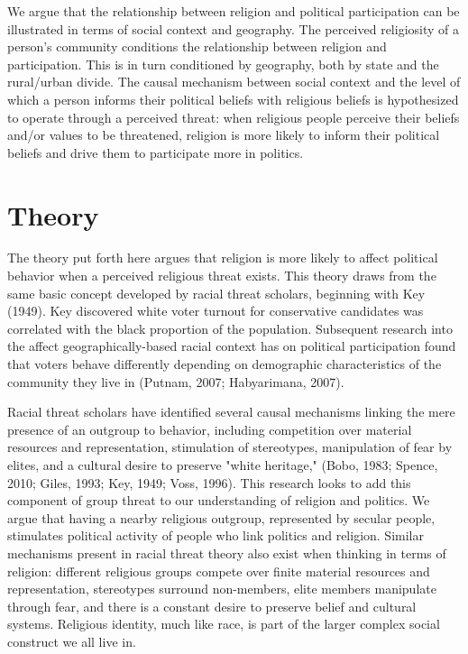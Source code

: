 \documentclass{article}
\begin{document}
We argue that the relationship between religion and political participation can be illustrated in terms of social context and geography.  The perceived religiosity of a person's community conditions the relationship between religion and participation.  This is in turn conditioned by geography, both by state and the rural/urban divide.  The causal mechanism between social context and the level of which a person informs their political beliefs with religious beliefs is hypothesized to operate through a perceived threat: when religious people perceive their beliefs and/or values to be threatened, religion is more likely to inform their political beliefs and drive them to participate more in politics.  

\section*{Theory}
The theory put forth here argues that religion is more likely to affect political behavior when a perceived religious threat exists.  This theory draws from the same basic concept developed by racial threat scholars, beginning with Key (1949).  Key discovered white voter turnout for conservative candidates was correlated with the black proportion of the population.  Subsequent research into the affect geographically-based racial context has on political participation found that voters behave differently depending on demographic characteristics of the community they live in (Putnam, 2007; Habyarimana, 2007).

Racial threat scholars have identified several causal mechanisms linking the mere presence of an outgroup to behavior, including competition over material resources and representation, stimulation of stereotypes, manipulation of fear by elites, and a cultural desire to preserve "white heritage," (Bobo, 1983; Spence, 2010; Giles, 1993; Key, 1949; Voss, 1996).  This research looks to add this component of group threat to our understanding of religion and politics.  We argue that having a nearby religious outgroup, represented by secular people, stimulates political activity of people who link politics and religion.  Similar mechanisms present in racial threat theory also exist when thinking in terms of religion: different religious groups compete over finite material resources and representation, stereotypes surround non-members, elite members manipulate through fear, and there is a constant desire to preserve belief and cultural systems.  Religious identity, much like race, is part of the larger complex social construct we all live in.  
\end{document}

